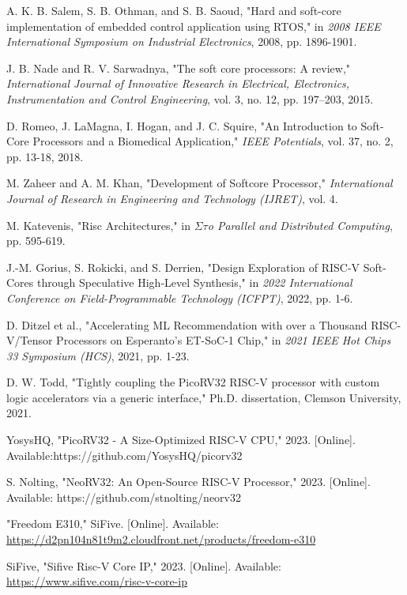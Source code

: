 \documentclass[conference]{IEEEtran}
\begin{document}
\begin{thebibliography}{1}


A. K. B. Salem, S. B. Othman, and S. B. Saoud, "Hard and soft-core implementation of embedded control application using RTOS," in \emph{2008 IEEE International Symposium on Industrial Electronics}, 2008, pp. 1896-1901.

J. B. Nade and R. V. Sarwadnya, "The soft core processors: A review," \emph{International Journal of Innovative Research in Electrical, Electronics, Instrumentation and Control Engineering}, vol. 3, no. 12, pp. 197–203, 2015.

D. Romeo, J. LaMagna, I. Hogan, and J. C. Squire, "An Introduction to Soft-Core Processors and a Biomedical Application," \emph{IEEE Potentials}, vol. 37, no. 2, pp. 13-18, 2018.

M. Zaheer and A. M. Khan, "Development of Softcore Processor," \emph{International Journal of Research in Engineering and Technology (IJRET)}, vol. 4.

M. Katevenis, "Risc Architectures," in \emph{$\Sigma$$\tau$o Parallel and Distributed Computing}, pp. 595-619.

J.-M. Gorius, S. Rokicki, and S. Derrien, "Design Exploration of RISC-V Soft-Cores through Speculative High-Level Synthesis," in \emph{2022 International Conference on Field-Programmable Technology (ICFPT)}, 2022, pp. 1-6.

D. Ditzel et al., "Accelerating ML Recommendation with over a Thousand RISC-V/Tensor Processors on Esperanto’s ET-SoC-1 Chip," in \emph{2021 IEEE Hot Chips 33 Symposium (HCS)}, 2021, pp. 1-23.

D. W. Todd, "Tightly coupling the PicoRV32 RISC-V processor with custom logic accelerators via a generic interface," Ph.D. dissertation, Clemson University, 2021.

YosysHQ, "PicoRV32 - A Size-Optimized RISC-V CPU," 2023. [Online]. Available:{https://github.com/YosysHQ/picorv32}

S. Nolting, "NeoRV32: An Open-Source RISC-V Processor," 2023. [Online]. Available: {https://github.com/stnolting/neorv32}

"Freedom E310," SiFive. [Online]. Available: \url{https://d2pn104n81t9m2.cloudfront.net/products/freedom-e310}

SiFive, "Sifive Risc-V Core IP," 2023. [Online]. Available: \url{https://www.sifive.com/risc-v-core-ip}


\end{thebibliography}
\end{document}
